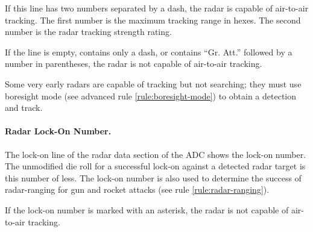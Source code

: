 {If this line has two numbers separated by a dash, the radar is capable of air-to-air tracking. The first number is the maximum tracking range in hexes. The second number is the radar tracking strength rating. 

If the line is empty, contains only a dash, or contains “Gr. Att.” followed by a number in parentheses, the radar is not capable of air-to-air tracking.

Some very early radars are capable of tracking but not searching; they must use boresight mode (see advanced rule \ref{rule:boresight-mode}) to obtain a detection and track.

\paragraph{Radar Lock-On Number.} The lock-on line of the radar data section of the ADC shows the lock-on number. The unmodified die roll for a successful lock-on against a detected radar target is this number of less. The lock-on number is also used to determine the success of radar-ranging for gun and rocket attacks (see rule \ref{rule:radar-ranging}). 

If the lock-on number is marked with an asterisk, the radar is not capable of air-to-air tracking.

}

